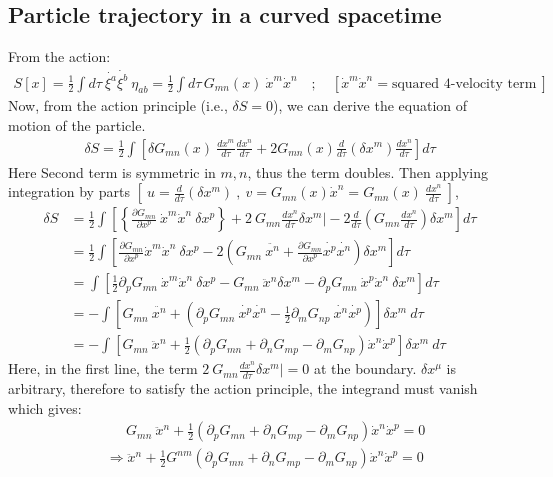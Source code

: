 \documentclass[14pt]{article} %
\begin{document}
\subsection{Particle trajectory in a curved spacetime}
From the action:
\begin{align*}
S[x] = \frac{1}{2} \int d\tau ~\dot{\xi^a}\dot{\xi^b}~ \eta_{ab}
= \frac{1}{2} \int d\tau\, G_{mn}(x) ~\dot{x}^m \dot{x}^n
\quad;\quad [\dot{x}^m \dot{x}^n =\text{squared 4-velocity term} ~]
\end{align*}
\noindent
Now, from the action principle (i.e., $\delta S = 0$), we can derive the equation of motion of the particle.
\begin{align*}
\delta S = \frac{1}{2} \int \left[ \delta G_{mn}(x)~ \frac{dx^m}{d \tau} \frac{dx^n}{d \tau} + 2 G_{mn}(x) \frac{d}{d\tau} (\delta x^m) \frac{dx^n}{d \tau} \right] d\tau
\end{align*}
Here Second term is symmetric in $m,n$, thus the term doubles. Then applying integration by parts $\left[~ u=\frac{d}{d\tau} (\delta x^m)~,~v=G_{mn}(x) \dot{x}^n=G_{mn}(x) ~\frac{dx^n}{d\tau} ~\right]$,
\begin{align*}
\delta S &= \frac{1}{2} \int \left[ \left\{\frac{\partial G_{mn}}{\partial x^p}~\dot{x}^m \dot{x}^n~\delta x^p \right\} + 2~G_{mn} \frac{dx^n}{d\tau} \delta x^m\Bigg| -2 \frac{d}{d\tau}\left(G_{mn}\frac{dx^n}{d\tau}\right)\delta x^m \right] d\tau \\
&= \frac{1}{2} \int \left[ \frac{\partial G_{mn}}{\partial x^p} \dot{x}^m \dot{x}^n~\delta x^p -2 \left(G_{mn}~\ddot{x^n}+\frac{\partial G_{mn}}{\partial x^p} \dot{x^p}\dot{x^n}  \right)\delta x^m \right] d\tau \\
&= \int \left[ \frac{1}{2}\partial_p G_{mn}~\dot{x}^m \dot{x}^n~\delta x^p - G_{mn}~\ddot{x}^n \delta x^m - \partial_p G_{mn}~\dot{x}^p \dot{x}^n~\delta x^m  \right] d\tau \\
&= -\int \left[ G_{mn}~\ddot{x^n} + \left( \partial_p G_{mn}~\dot{x^p}\dot{x^n} - \frac{1}{2}\partial_m G_{np}~\dot{x^n} \dot{x^p} \right) \right] \delta x^m~d\tau  \\
&= - \int \left[ G_{mn}~\ddot{x}^n + \frac{1}{2} \left( \partial_p G_{mn} + \partial_n G_{mp} - \partial_m G_{np} \right) \dot{x}^n \dot{x}^p \right] \delta x^m~d \tau
\end{align*}
Here, in the first line, the term $2~G_{mn} \frac{dx^n}{d\tau} \delta x^m\Bigg|=0$ at the boundary. $\delta x^\mu$ is arbitrary, therefore to satisfy the action principle, the integrand must vanish which gives:
\begin{align*}
&\quad ~~ G_{mn}~\ddot{x}^n + \frac{1}{2} \left( \partial_p G_{mn} + \partial_n G_{mp} - \partial_m G_{np} \right) \dot{x}^n \dot{x}^p = 0 \\
& \Rightarrow \ddot{x}^n + \frac{1}{2}G^{nm} \left( \partial_p G_{mn} + \partial_n G_{mp} - \partial_m G_{np} \right) \dot{x}^n \dot{x}^p = 0
\end{align*}
\end{document}
